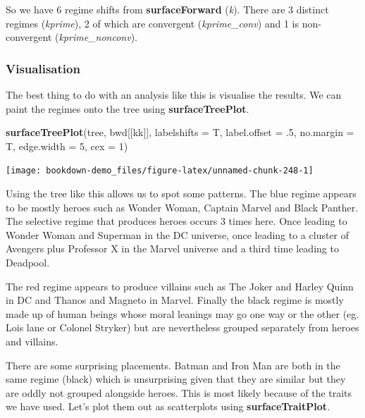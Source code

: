 \documentclass[
]{book}
\newenvironment{Shaded}{\begin{snugshade}}{\end{snugshade}}
\newcommand{\DataTypeTok}[1]{\textcolor[rgb]{0.13,0.29,0.53}{#1}}
\newcommand{\DecValTok}[1]{\textcolor[rgb]{0.00,0.00,0.81}{#1}}
\newcommand{\FloatTok}[1]{\textcolor[rgb]{0.00,0.00,0.81}{#1}}
\newcommand{\KeywordTok}[1]{\textcolor[rgb]{0.13,0.29,0.53}{\textbf{#1}}}
\newcommand{\NormalTok}[1]{#1}
\begin{document}
So we have 6 regime shifts from \textbf{surfaceForward} (\emph{k}). There are 3 distinct regimes (\emph{kprime}), 2 of which are convergent (\emph{kprime\_conv}) and 1 is non-convergent (\emph{kprime\_nonconv}).

\hypertarget{visualisation}{%
\subsubsection{Visualisation}\label{visualisation}}

The best thing to do with an analysis like this is visualise the results. We can paint the regimes onto the tree using \textbf{surfaceTreePlot}.

\begin{Shaded}
\begin{Highlighting}[]
\KeywordTok{surfaceTreePlot}\NormalTok{(tree, bwd[[kk]], }\DataTypeTok{labelshifts =}\NormalTok{ T, }\DataTypeTok{label.offset =} \FloatTok{.5}\NormalTok{, }
                \DataTypeTok{no.margin =}\NormalTok{ T, }\DataTypeTok{edge.width =} \DecValTok{5}\NormalTok{, }\DataTypeTok{cex =} \DecValTok{1}\NormalTok{)}
\end{Highlighting}
\end{Shaded}

\begin{center}\texttt{[image: bookdown-demo\_files/figure-latex/unnamed-chunk-248-1]} \end{center}

Using the tree like this allows us to spot some patterns. The blue regime appears to be mostly heroes such as Wonder Woman, Captain Marvel and Black Panther. The selective regime that produces heroes occurs 3 times here. Once leading to Wonder Woman and Superman in the DC universe, once leading to a cluster of Avengers plus Professor X in the Marvel universe and a third time leading to Deadpool.

The red regime appears to produce villains such as The Joker and Harley Quinn in DC and Thanos and Magneto in Marvel. Finally the black regime is mostly made up of human beings whose moral leanings may go one way or the other (eg. Lois lane or Colonel Stryker) but are nevertheless grouped separately from heroes and villains.

There are some surprising placements. Batman and Iron Man are both in the same regime (black) which is unsurprising given that they are similar but they are oddly not grouped alongside heroes. This is most likely because of the traits we have used. Let's plot them out as scatterplots using \textbf{surfaceTraitPlot}.
\end{document}
